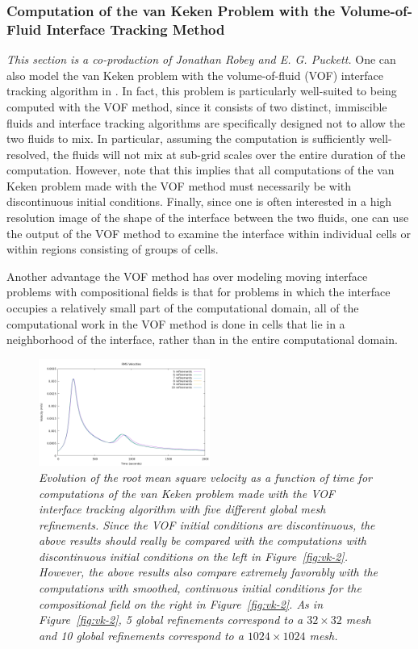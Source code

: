 \subsubsection{Computation of the van Keken Problem with the Volume-of-Fluid Interface Tracking Method}
\label{sec:van-keken VOF interface tracking}

\textit{This section is a co-production of Jonathan Robey and E. G. Puckett.}
One can also model the van Keken problem with the volume-of-fluid (VOF) interface tracking 
algorithm in \aspect{}.
In fact, this problem is particularly well-suited to being computed with the VOF method, since 
it consists of two distinct, immiscible fluids and interface tracking algorithms are 
specifically designed not to allow the two fluids to mix.
In particular, assuming the computation is sufficiently well-resolved, the fluids will not mix 
at sub-grid scales over the entire duration of the computation.
However, note that this implies that all computations of the van Keken problem made with the VOF 
method must necessarily be with discontinuous initial conditions.
Finally, since one is often interested in a high resolution image of the shape of the interface 
between the two fluids, one can use the output of the VOF method to examine the interface 
within individual cells or within regions consisting of groups of cells.

Another advantage the VOF method has over modeling moving interface problems with compositional 
fields is that for problems in which the interface occupies a relatively small part of the 
computational domain, all of the computational work in the VOF method is done in cells that lie 
in a neighborhood of the interface, rather than in the entire computational domain. 

\begin{figure}
   \centering
\includegraphics[width=0.5\textwidth]{cookbooks/van-keken-vof/doc/rms_vel_comparison.png}
   \caption{\it Evolution of the root mean square velocity as a function of time for computations 
    of the van Keken problem made with the VOF interface tracking algorithm with five 
    different global mesh refinements.
    Since the VOF initial conditions are discontinuous, the above results should really be 
    compared with the computations with discontinuous initial conditions on the left in 
    Figure~\ref{fig:vk-2}. However, the above results also compare extremely favorably with the 
    computations with smoothed, continuous initial conditions for the compositional field on 
    the right in Figure~\ref{fig:vk-2}.
    As in Figure~\ref{fig:vk-2}, 5 global refinements correspond to a $32 \times 32$ mesh and 10 global refinements correspond to a $1024 \times 1024$ mesh.}
    \label{fig:vof-vk-1}
\end{figure}

